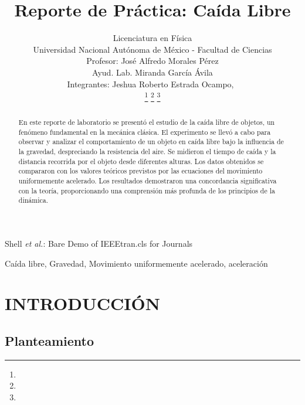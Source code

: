 \documentclass[journal]{IEEEtran}
\begin{document}
\title{Reporte de Práctica: Caída Libre }

\author{Licenciatura en Física	\\
Universidad Nacional Autónoma de México - Facultad de Ciencias\\
Profesor: José Alfredo Morales Pérez\\
Ayud. Lab.	Miranda García Ávila\\
Integrantes: Jeshua Roberto Estrada Ocampo,~\\

            
\thanks{}%
\thanks{}%
\thanks{}}

%
{Shell \MakeLowercase{\textit{et al.}}: Bare Demo of IEEEtran.cls for Journals}

\maketitle

\begin{abstract}
En este reporte de laboratorio se presentó el estudio de la caída libre de objetos, un fenómeno fundamental en la mecánica clásica. El experimento se llevó a cabo para observar y analizar el comportamiento de un objeto en caída libre bajo la influencia de la gravedad, despreciando la resistencia del aire. Se midieron el tiempo de caída y la distancia recorrida por el objeto desde diferentes alturas. Los datos obtenidos se compararon con los valores teóricos previstos por las ecuaciones del movimiento uniformemente acelerado. Los resultados demostraron una concordancia significativa con la teoría, proporcionando una comprensión más profunda de los principios de la dinámica.
\end{abstract}

\begin{IEEEkeywords}
Caída libre, Gravedad, Movimiento uniformemente acelerado, aceleración
\end{IEEEkeywords}

\IEEEpeerreviewmaketitle

\section{INTRODUCCIÓN}
\subsection{Planteamiento}
\end{document}
